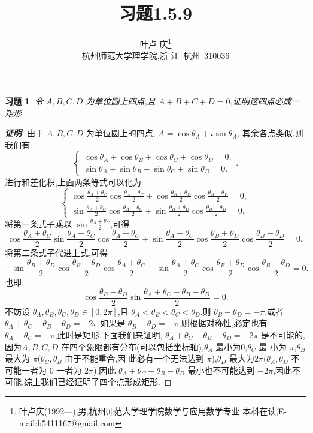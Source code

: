 \documentclass[a4paper]{article}
\newtheorem*{exercise}{习题}
\begin{document}
\title{\huge{\bf{习题1.5.9}}} \author{\small{叶卢
    庆\footnote{叶卢庆(1992---),男,杭州师范大学理学院数学与应用数学专业
      本科在读,E-mail:h5411167@gmail.com}}\\{\small{杭州师范大学理学院,浙
      江~杭州~310036}}}
\maketitle
\begin{exercise}
  令 $A,B,C,D$ 为单位圆上四点,且 $A+B+C+D=0$,证明这四点必成一矩形.
\end{exercise}
\begin{proof}[\textbf{证明}]
由于 $A,B,C,D$ 为单位圆上的四点, $A=\cos\theta_A+i\sin\theta_A$,
其余各点类似.则我们有
$$
\begin{cases}
  \cos\theta_A+\cos\theta_B+\cos\theta_C+\cos\theta_D=0,\\
  \sin\theta_A+\sin\theta_B+\sin\theta_C+\sin\theta_D=0.
\end{cases}.
$$
进行和差化积,上面两条等式可以化为
$$
\begin{cases}
  \cos \frac{\theta_A+\theta_C}{2}\cos \frac{\theta_A-\theta_C}{2}+\cos
  \frac{\theta_B+\theta_D}{2}\cos\frac{\theta_B-\theta_D}{2}=0,\\
\sin \frac{\theta_A+\theta_C}{2}\cos \frac{\theta_A-\theta_C}{2}+\sin \frac{\theta_B+\theta_D}{2}\cos \frac{\theta_B-\theta_D}{2}=0.
\end{cases}
$$
将第一条式子乘以 $\sin \frac{\theta_A+\theta_C}{2}$,可得
$$
\cos \frac{\theta_A+\theta_C}{2}\sin \frac{\theta_A+\theta_C}{2}\cos \frac{\theta_A-\theta_C}{2}+\sin
\frac{\theta_A+\theta_C}{2}\cos \frac{\theta_B+\theta_D}{2}\cos \frac{\theta_B-\theta_D}{2}=0,
$$
将第二条式子代进上式,可得
$$
-\sin \frac{\theta_B+\theta_D}{2}\cos \frac{\theta_B-\theta_D}{2}\cos \frac{\theta_A+\theta_C}{2}+\sin
\frac{\theta_A+\theta_C}{2}\cos \frac{\theta_B+\theta_D}{2}\cos \frac{\theta_B-\theta_D}{2}=0.
$$
也即,
$$
\cos \frac{\theta_B-\theta_D}{2}\sin \frac{\theta_A+\theta_C-\theta_B-\theta_D}{2}=0.
$$
不妨设 $\theta_A,\theta_B,\theta_C,\theta_D\in [0,2\pi]$,且 $\theta_A<\theta_B<\theta_C<\theta_D$.则
$\theta_B-\theta_D=-\pi$,或者
$\theta_A+\theta_C-\theta_B-\theta_D=- 2\pi$.如果是
$\theta_B-\theta_D=-\pi$,则根据对称性,必定也有
$\theta_A-\theta_C=-\pi$,此时是矩形.下面我们来证明,
$\theta_A+\theta_C-\theta_B-\theta_D=-2\pi$ 是不可能的,因为$A,B,C,D$
在四个象限都有分布(可以包括坐标轴),$\theta_{A}$ 最小为0,$\theta_C$ 最
小为 $\pi$,$\theta_B$ 最大为 $\pi$($\theta_C,\theta_B$ 由于不能重合,因
此必有一个无法达到 $\pi$),$\theta_D$ 最大为$2\pi$($\theta_A,\theta_D$
不可能一者为 $0$ 一者为 $2\pi$),因此
$\theta_A+\theta_C-\theta_B-\theta_D$ 最小也不可能达到 $-2\pi$,因此不
可能.综上我们已经证明了四个点形成矩形.
\end{proof}
\end{document}
